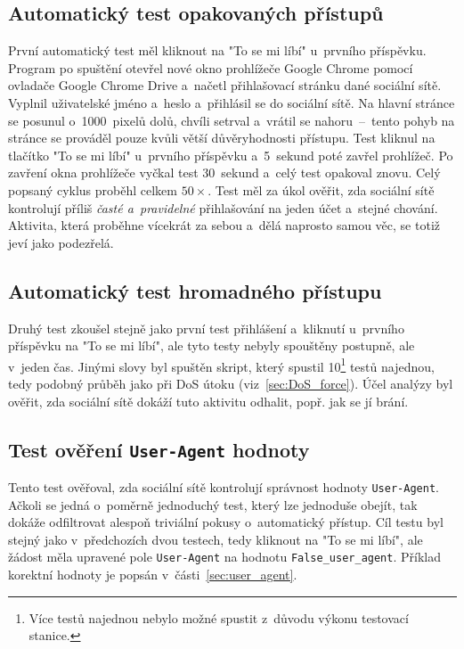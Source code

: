 \subsection*{Automatický test opakovaných přístupů}
\label{sec:repeated_behaviour}
První automatický test měl kliknout na "To se mi líbí" u~prvního příspěvku. Program po spuštění otevřel nové okno prohlížeče Google Chrome pomocí ovladače Google Chrome Drive a~načetl přihlašovací stránku dané sociální sítě. Vyplnil uživatelské jméno a~heslo a~přihlásil se do sociální sítě. Na hlavní stránce se posunul o~1000~pixelů dolů, chvíli setrval a~vrátil se nahoru~--~tento pohyb na stránce se prováděl pouze kvůli větší důvěryhodnosti přístupu. Test kliknul na tlačítko "To se mi líbí" u~prvního příspěvku a~5~sekund poté zavřel prohlížeč. Po zavření okna prohlížeče vyčkal test 30~sekund a~celý test opakoval znovu. Celý popsaný cyklus proběhl celkem $50\times$. Test měl za úkol ověřit, zda sociální sítě kontrolují příliš \textit{časté a~pravidelné} přihlašování na jeden účet a~stejné chování. Aktivita, která proběhne vícekrát za sebou a~dělá naprosto samou věc, se totiž jeví jako podezřelá.

\subsection*{Automatický test hromadného přístupu}
\label{sec:dos_test}
Druhý test zkoušel stejně jako první test přihlášení a~kliknutí u~prvního příspěvku na "To se mi líbí", ale tyto testy nebyly spouštěny postupně, ale v~jeden čas. Jinými slovy byl spuštěn skript, který spustil 10\footnote{Více testů najednou nebylo možné spustit z~důvodu výkonu testovací stanice.} testů najednou, tedy podobný průběh jako při DoS útoku (viz~\ref{sec:DoS_force}). Účel analýzy byl ověřit, zda sociální sítě dokáží tuto aktivitu odhalit, popř. jak se jí brání.

\subsection*{Test ověření \texttt{User-Agent} hodnoty}
Tento test ověřoval, zda sociální sítě kontrolují správnost hodnoty \texttt{User-Agent}. Ačkoli se jedná o~poměrně jednoduchý test, který lze jednoduše obejít, tak dokáže odfiltrovat alespoň triviální pokusy o~automatický přístup. Cíl testu byl stejný jako v~předchozích dvou testech, tedy kliknout na "To se mi líbí", ale žádost měla upravené pole \texttt{User-Agent} na hodnotu \texttt{False\_user\_agent}. Příklad korektní hodnoty je popsán v~části~\ref{sec:user_agent}.

